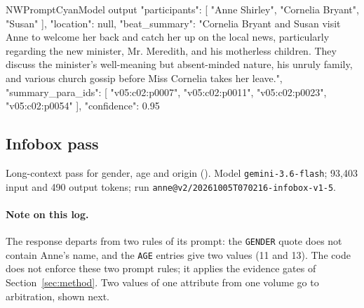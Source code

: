\begin{nwprompt}{NWPromptCyan}{Model output}
{
  "participants": [
    "Anne Shirley",
    "Cornelia Bryant",
    "Susan"
  ],
  "location": null,
  "beat_summary": "Cornelia Bryant and Susan visit Anne to welcome her back and catch her up on the local news, particularly regarding the new minister, Mr. Meredith, and his motherless children. They discuss the minister's well-meaning but absent-minded nature, his unruly family, and various church gossip before Miss Cornelia takes her leave.",
  "summary_para_ids": [
    "v05:c02:p0007",
    "v05:c02:p0011",
    "v05:c02:p0023",
    "v05:c02:p0054"
  ],
  "confidence": 0.95
}
\end{nwprompt}

\subsection*{Infobox pass}
Long-context pass for gender, age and origin (\sys). Model \texttt{gemini-3.6-flash}; 93,403 input and 490 output tokens; run \nolinkurl{anne@v2/20261005T070216-infobox-v1-5}.

\paragraph{Note on this log.} The response departs from two rules of its prompt: the
\texttt{GENDER} quote does not contain Anne's name, and the \texttt{AGE} entries give two
values (11 and 13). The code does not enforce these two prompt rules; it applies the
evidence gates of Section~\ref{sec:method}. Two values of one attribute from one volume go
to arbitration, shown next.

